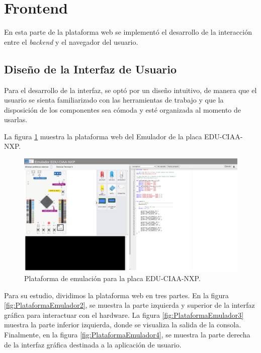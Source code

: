 \section{Frontend}
En esta parte de la plataforma web se implementó el desarrollo de la interacción entre el \textit{backend} y el navegador del usuario.


\subsection{Diseño de la Interfaz de Usuario}

Para el desarrollo de la interfaz, se optó por un diseño intuitivo, de manera que el usuario se sienta familiarizado con las herramientas de trabajo y que la disposición de los componentes sea cómoda y esté organizada al momento de usarlas.

La figura \ref{fig:PlataformaEmulador1} muestra la plataforma web del Emulador de la placa EDU-CIAA-NXP.

\begin{figure}[ht]
	\centering
	\includegraphics[scale=.28]{./Figures/PlataformaEmulador.png}
	\caption{Plataforma de emulación para la placa EDU-CIAA-NXP.}
	\label{fig:PlataformaEmulador1}
\end{figure}


Para su estudio, dividimos la plataforma web en tres partes. En la figura \ref{fig:PlataformaEmulador2}, se muestra la parte izquierda y superior de la interfaz gráfica para interactuar con el hardware. La figura \ref{fig:PlataformaEmulador3} muestra la parte inferior izquierda, donde se visualiza la salida de la consola. Finalmente, en la figura \ref{fig:PlataformaEmulador4}, se muestra la parte derecha de la interfaz gráfica destinada a la aplicación de usuario.

